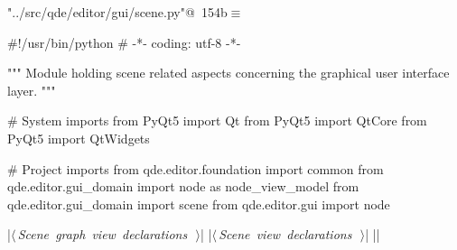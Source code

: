 \documentclass[%
    a4paper,    %
    justified,  %
    nobib,      %
    openany     %
]{tufte-book}
\begin{document}
\begin{flushleft} \small
\begin{minipage}{\linewidth}\label{scrap174}\raggedright\small
{} \verb@"../src/qde/editor/gui/scene.py"@\nobreak\ {\footnotesize {154b}}$\equiv$
\vspace{-1ex}
\begin{pythoncode}
#!/usr/bin/python
# -*- coding: utf-8 -*-

""" Module holding scene related aspects concerning the graphical user interface layer.
"""

# System imports
from PyQt5 import Qt
from PyQt5 import QtCore
from PyQt5 import QtWidgets

# Project imports
from qde.editor.foundation import common
from qde.editor.gui_domain import node as node_view_model
from qde.editor.gui_domain import scene
from qde.editor.gui import node

|\hbox{$\langle\,${\itshape Scene graph view declarations}\nobreak\ {\footnotesize {}}$\,\rangle$}|
|\hbox{$\langle\,${\itshape Scene view declarations}\nobreak\ {\footnotesize {}}$\,\rangle$}|
|\NWsep|
\end{pythoncode}
\vspace{1.5ex}
\footnotesize
\begin{list}{}{\setlength{\itemsep}{-\parsep}\setlength{\itemindent}{-\leftmargin}}

\item{}
\end{list}
\end{minipage}\vspace{4ex}
\end{flushleft}
\end{document}
